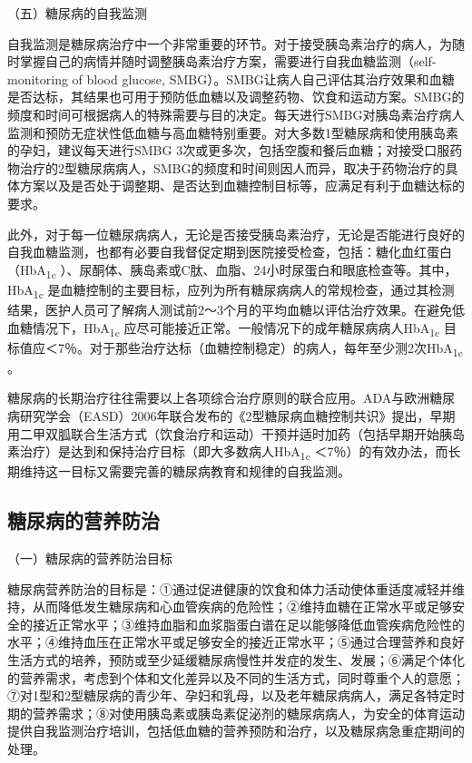 （五）糖尿病的自我监测

自我监测是糖尿病治疗中一个非常重要的环节。对于接受胰岛素治疗的病人，为随时掌握自己的病情并随时调整胰岛素治疗方案，需要进行自我血糖监测（self-monitoring
of blood glucose,
SMBG）。SMBG让病人自己评估其治疗效果和血糖是否达标，其结果也可用于预防低血糖以及调整药物、饮食和运动方案。SMBG的频度和时间可根据病人的特殊需要与目的决定。每天进行SMBG对胰岛素治疗病人监测和预防无症状性低血糖与高血糖特别重要。对大多数1型糖尿病和使用胰岛素的孕妇，建议每天进行SMBG
3次或更多次，包括空腹和餐后血糖；对接受口服药物治疗的2型糖尿病病人，SMBG的频度和时间则因人而异，取决于药物治疗的具体方案以及是否处于调整期、是否达到血糖控制目标等，应满足有利于血糖达标的要求。

此外，对于每一位糖尿病病人，无论是否接受胰岛素治疗，无论是否能进行良好的自我血糖监测，也都有必要自我督促定期到医院接受检查，包括：糖化血红蛋白（HbA\textsubscript{1c}
）、尿酮体、胰岛素或C肽、血脂、24小时尿蛋白和眼底检查等。其中，HbA\textsubscript{1c}
是血糖控制的主要目标，应列为所有糖尿病病人的常规检查，通过其检测结果，医护人员可了解病人测试前2～3个月的平均血糖以评估治疗效果。在避免低血糖情况下，HbA\textsubscript{1c}
应尽可能接近正常。一般情况下的成年糖尿病病人HbA\textsubscript{1c}
目标值应＜7％。对于那些治疗达标（血糖控制稳定）的病人，每年至少测2次HbA\textsubscript{1c}
。

糖尿病的长期治疗往往需要以上各项综合治疗原则的联合应用。ADA与欧洲糖尿病研究学会（EASD）2006年联合发布的《2型糖尿病血糖控制共识》提出，早期用二甲双胍联合生活方式（饮食治疗和运动）干预并适时加药（包括早期开始胰岛素治疗）是达到和保持治疗目标（即大多数病人HbA\textsubscript{1c}
＜7％）的有效办法，而长期维持这一目标又需要完善的糖尿病教育和规律的自我监测。

\hypertarget{text00004.htmlux5cux23mllj24}{%
\subsection{糖尿病的营养防治}\label{text00004.htmlux5cux23mllj24}}

（一）糖尿病的营养防治目标

糖尿病营养防治的目标是：①通过促进健康的饮食和体力活动使体重适度减轻并维持，从而降低发生糖尿病和心血管疾病的危险性；②维持血糖在正常水平或足够安全的接近正常水平；③维持血脂和血浆脂蛋白谱在足以能够降低血管疾病危险性的水平；④维持血压在正常水平或足够安全的接近正常水平；⑤通过合理营养和良好生活方式的培养，预防或至少延缓糖尿病慢性并发症的发生、发展；⑥满足个体化的营养需求，考虑到个体和文化差异以及不同的生活方式，同时尊重个人的意愿；⑦对1型和2型糖尿病的青少年、孕妇和乳母，以及老年糖尿病病人，满足各特定时期的营养需求；⑧对使用胰岛素或胰岛素促泌剂的糖尿病病人，为安全的体育运动提供自我监测治疗培训，包括低血糖的营养预防和治疗，以及糖尿病急重症期间的处理。

